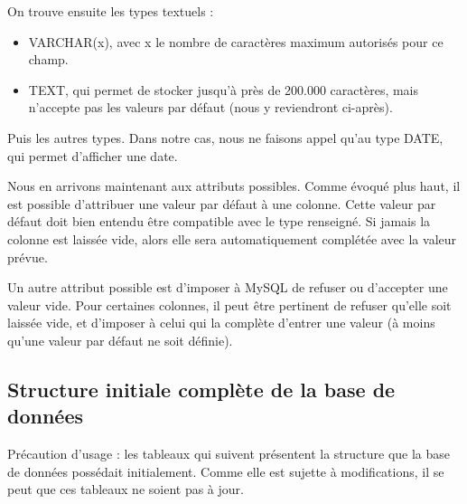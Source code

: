 \documentclass[12pt,a4paper]{article}
\begin{document}
        On trouve ensuite les types textuels :
        \begin{itemize}
            \item VARCHAR(x), avec x le nombre de caractères maximum autorisés
            pour ce champ.
            \item TEXT, qui permet de stocker jusqu'à près de 200.000 caractères,
            mais n'accepte pas les valeurs par défaut (nous y reviendront ci-après).
        \end{itemize}

        Puis les autres types. Dans notre cas, nous ne faisons appel
        qu'au type DATE, qui permet d'afficher une date.

        Nous en arrivons maintenant aux attributs possibles.
        Comme évoqué plus haut, il est possible d'attribuer une valeur
        par défaut à une colonne. Cette valeur par défaut doit bien entendu
        être compatible avec le type renseigné. Si jamais la colonne est laissée
        vide, alors elle sera automatiquement complétée avec la valeur prévue.

        Un autre attribut possible est d'imposer à MySQL de refuser ou
        d'accepter une valeur vide. Pour certaines colonnes, il peut être
        pertinent de refuser qu'elle soit laissée vide, et d'imposer à celui
        qui la complète d'entrer une valeur (à moins qu'une valeur par défaut
        ne soit définie).


    \subsection{Structure initiale complète de la base de données}\label{structureinitiale}
    Précaution d'usage : les tableaux qui suivent présentent la structure que la base
    de données possédait initialement. Comme elle est sujette à modifications, il se
    peut que ces tableaux ne soient pas à jour.
    
\end{document}
